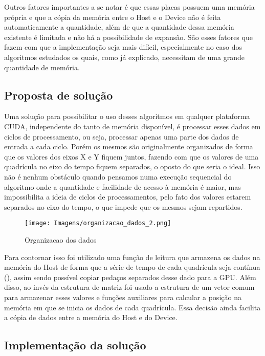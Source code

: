 Outros fatores importantes a se notar é que essas placas possuem uma memória própria e que a cópia da memória entre o Host e o Device não é feita automaticamente a quantidade, além de que a quantidade dessa memória existente é limitada e não há a possibilidade de expansão. São esses fatores que fazem com que a implementação seja mais difícil, especialmente no caso dos algoritmos estudados os quais, como já explicado, necessitam de uma grande quantidade de memória.

\subsection{Proposta de solução}

Uma solução para possibilitar o uso desses algoritmos em qualquer plataforma CUDA, independente do tanto de memória disponível, é processar esses dados em ciclos de processamento, ou seja, processar apenas uma parte dos dados de entrada a cada ciclo. Porém os mesmos são originalmente organizados de forma que os valores dos eixos X e Y fiquem juntos, fazendo com que os valores de uma quadrícula no eixo do tempo fiquem separados, o oposto do que seria o ideal. Isso não é nenhum obstáculo quando pensamos numa execução sequencial do algoritmo onde a quantidade e facilidade de acesso à memória é maior, mas impossibilita a ideia de ciclos de processamentos, pelo fato dos valores estarem separados no eixo do tempo, o que impede que os mesmos sejam repartidos.

\begin{figure}[H]
\centering
\texttt{[image: Imagens/organizacao\_dados\_2.png]}
\caption{Organizacao dos dados}
\label{fig:organizacao_dados_2}
\end{figure}

Para contornar isso foi utilizado uma função de leitura que armazena os dados na memória do Host de forma que a série de tempo de cada quadrícula seja contínua (\label{fig:organizacao_dados_2}), assim sendo possível copiar pedaços separados desse dado para a GPU. Além disso, ao invés da estrutura de matriz foi usado a estrutura de um vetor comum para armazenar esses valores e funções auxiliares para calcular a posição na memória em que se inicia os dados de cada quadrícula. Essa decisão ainda facilita a cópia de dados entre a memória do Host e do Device.

\subsection{Implementação da solução}

